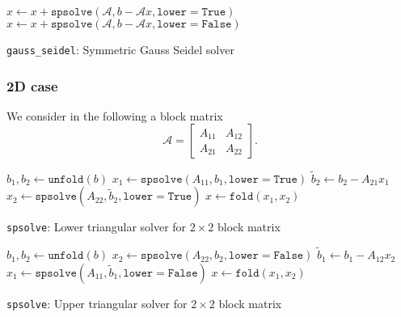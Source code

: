 \begin{minipage}{\textwidth}
  \begin{algorithm}[H]
  \DontPrintSemicolon
  \SetAlgoLined
  \BlankLine

     {
      $x \gets x + \texttt{spsolve}(\mathcal{A}, b - \mathcal{A} x, \texttt{lower}=\texttt{True})$ \; 
    }
     {
      $x \gets x + \texttt{spsolve}(\mathcal{A}, b - \mathcal{A} x, \texttt{lower}=\texttt{False})$ \; 
    }

  \caption{\texttt{gauss\_seidel}: Symmetric Gauss Seidel solver}
  \label{algo:gauss-seidel-symmetric}
  \end{algorithm} 
\end{minipage}

\subsubsection*{2D case}
We consider in the following a block matrix 
%
\begin{equation} %
\mathcal{A} =\begin{bmatrix}
 A_{11} & A_{12}  \\
 A_{21} & A_{22} 
\end{bmatrix}.
\end{equation}
%

\begin{minipage}{0.5\textwidth}
\begin{algorithm}[H]
\DontPrintSemicolon
\SetAlgoLined
{}
\BlankLine

  $b_1, b_2 \gets \texttt{unfold}(b)$ \; 
  $x_1 \gets \texttt{spsolve}(A_{11}, b_1, \texttt{lower}=\texttt{True})$ \; 
  $\tilde{b}_2 \gets b_2 - A_{21} x_1$ \;        
  $x_2 \gets \texttt{spsolve}(A_{22}, \tilde{b}_2, \texttt{lower}=\texttt{True})$ \;
  $x \gets \texttt{fold}(x_1, x_2)$ \; 

\caption{\texttt{spsolve}: Lower triangular solver for $2 \times 2$ block matrix}
\end{algorithm} 
\end{minipage}
\begin{minipage}{0.5\textwidth}
\begin{algorithm}[H]
\DontPrintSemicolon
\SetAlgoLined
{}
\BlankLine

  $b_1, b_2 \gets \texttt{unfold}(b)$ \; 
  $x_2 \gets \texttt{spsolve}(A_{22}, b_2, \texttt{lower}=\texttt{False})$ \;            
  $\tilde{b}_1 \gets b_1 - A_{12} x_2$ \;
  $x_1 \gets \texttt{spsolve}(A_{11}, \tilde{b}_1, \texttt{lower}=\texttt{False})$ \;
  $x \gets \texttt{fold}(x_1, x_2)$ \; 

\caption{\texttt{spsolve}: Upper triangular solver for $2 \times 2$ block matrix}
\end{algorithm} 
\end{minipage}

